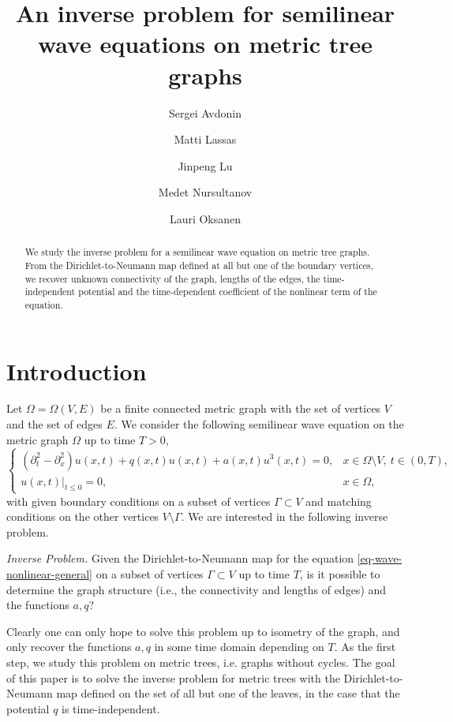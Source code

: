 \documentclass[11pt]{amsart}
\title{An inverse problem for semilinear wave equations on metric tree graphs}
\author{Sergei Avdonin}
\author{Matti Lassas}
\author{Jinpeng Lu}
\author{Medet Nursultanov}
\author{Lauri Oksanen}
\theoremstyle{definition}
\theoremstyle{plain}
\numberwithin{equation}{section}
\begin{document}
\maketitle

\vspace{-5mm}

\begin{abstract}
We study the inverse problem for a semilinear wave equation on metric tree graphs. From the Dirichlet-to-Neumann map defined at all but one of the boundary vertices, we recover unknown connectivity of the graph, lengths of the edges, the time-independent potential and the time-dependent coefficient of the nonlinear term of the equation.
\end{abstract}




\section{Introduction}

Let $\Omega=\Omega(V,E)$ be a finite connected metric graph with the set of vertices $V$ and the set of edges $E$. 
We consider the following semilinear wave equation on the metric graph $\Omega$ up to time $T>0$,
\begin{equation}\label{eq-wave-nonlinear-general}
    \begin{cases}
    (\partial_{t}^2 -\partial_x^2 ) u(x,t)+q(x,t) u(x,t)+a(x,t)u^3 (x,t)=0, &x\in \Omega\setminus V, \ t \in (0,T),\\
    u(x,t)|_{t \leq 0}=0, & x\in \Omega,
    \end{cases}
\end{equation}
with given boundary conditions on a subset of vertices $\Gamma\subset V$ and matching conditions on the other vertices $V\setminus \Gamma$. 
We are interested in the following inverse problem.

\smallskip
\emph{Inverse Problem.}
Given the Dirichlet-to-Neumann map for the equation \eqref{eq-wave-nonlinear-general} on a subset of vertices $\Gamma\subset V$ up to time $T$, is it possible to determine the graph structure (i.e., the connectivity and lengths of edges) and the functions $a,q$?

\smallskip
Clearly one can only hope to solve this problem up to isometry of the graph, and only recover the functions $a,q$ in some time domain depending on $T$.
As the first step, we study this problem on metric trees,
i.e. graphs without cycles.
The goal of this paper is to solve the inverse problem for metric trees with the Dirichlet-to-Neumann map defined on the set of all but one of the leaves, in the case that the potential $q$ is time-independent.
\end{document}
